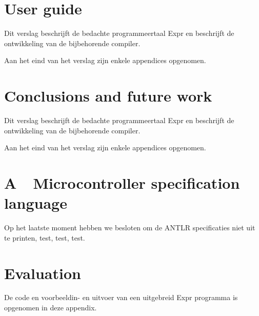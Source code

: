 \documentclass[a4paper]{report}
\begin{document}
\clearpage\chapter{User guide}
Dit verslag beschrijft de bedachte programmeertaal Expr en beschrijft de
ontwikkeling van de bijbehorende compiler.

Aan het eind van het verslag zijn enkele appendices opgenomen. 

\clearpage\chapter{Conclusions and future work}
Dit verslag beschrijft de bedachte programmeertaal Expr en beschrijft de
ontwikkeling van de bijbehorende compiler.

Aan het eind van het verslag zijn enkele appendices opgenomen. 

\clearpage\appendix\chapter[Microcontroller specification
language]{A\ \ Microcontroller specification language}
Op het laatste moment hebben we besloten om de ANTLR specificaties niet
uit te printen, test, test, test.

\clearpage\chapter[Evaluation]{Evaluation}
De code en voorbeeldin- en uitvoer van een uitgebreid Expr programma is
opgenomen in deze appendix.
\end{document}
